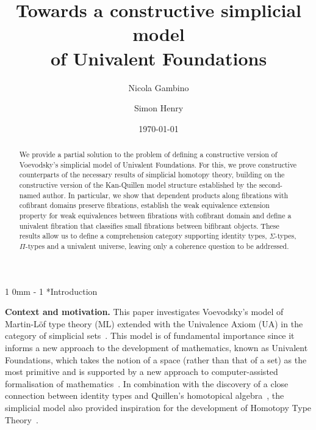 \documentclass[reqno,10pt,a4paper,oneside,draft]{amsart}
\title[]{Towards a constructive  simplicial model \\ of Univalent Foundations}
\makeatletter
\renewcommand{\section}{\@startsection
{section}%
{1}%
{0mm}%
{-\baselineskip}%
{1\baselineskip}%
{\Large \bfseries}}%
\numberwithin{equation}{section}
\theoremstyle{mythm}
\theoremstyle{mydef}
\theoremstyle{myrmk}
\makeatother
\begin{document}
\begin{abstract}
We provide a partial solution to the problem of defining a constructive version of 
Voevodsky's simplicial model of Univalent Foundations. For this, we prove constructive counterparts of the 
necessary results of simplicial homotopy theory, building on the constructive
version of the Kan-Quillen model structure established by the second-named author. In particular, 
 we show  that dependent products along fibrations with
 cofibrant domains preserve fibrations, establish the weak equivalence extension property
for weak equivalences between fibrations with cofibrant domain and define a univalent 
fibration that classifies small fibrations between bifibrant objects. 
These results allow us to define a comprehension category supporting identity types,
$\Sigma$-types, $\Pi$-types and a univalent universe, leaving only
a coherence question to be addressed.
\end{abstract}

\author{Nicola Gambino}
\address{School of Mathematics, University of Leeds, United Kingdom}


\author{Simon Henry}
\address{Department of Mathematics and Statistics, University of Ottawa, Canads}


 \date{\today}
 
 

\maketitle

\tableofcontents

\section*{Introduction} 

\textbf{Context and motivation.} This paper investigates Voevodsky's model of Martin-L\"of type theory (ML)
extended with the Univalence Axiom (UA)  in the category of simplicial sets~\cite{voevodsky-simplicial-model}.  This model is of fundamental importance since it  informs a new approach to the development of mathematics, known as Univalent Foundations, which takes the notion of a space (rather than that of a set) as the most primitive and is supported by a new approach to computer-assisted formalisation of mathematics~\cite{voevodsky:library}. In combination with the discovery of a close connection between identity types and Quillen's homotopical algebra~\cite{awodey-warren:homotopy-idtype,gambino-garner:idtypewfs}, the simplicial model also provided inspiration for the development of  Homotopy Type Theory~\cite{hottbook}.
\end{document}
